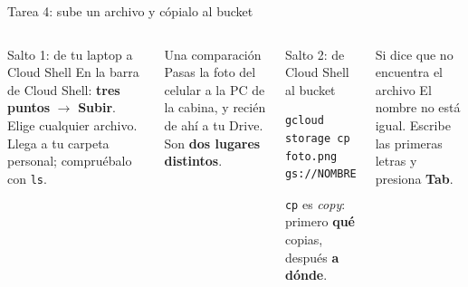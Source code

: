 \documentclass[aspectratio=169,10pt,c]{beamer}
\begin{document}
\begin{frame}[fragile]{Tarea 4: sube un archivo y cópialo al bucket}
\begin{center}
\end{center}
\begin{columns}[T,onlytextwidth]
\begin{block}{Salto 1: de tu laptop a Cloud Shell}
\small En la barra de Cloud Shell: \textbf{tres puntos} $\rightarrow$ \textbf{Subir}. Elige cualquier archivo. Llega a tu carpeta personal; compruébalo con \texttt{ls}.
\end{block}
\begin{exampleblock}{Una comparación}
\small Pasas la foto del celular a la PC de la cabina, y recién de ahí a tu Drive. Son \textbf{dos lugares distintos}.
\end{exampleblock}
\begin{block}{Salto 2: de Cloud Shell al bucket}
\begin{lstlisting}[basicstyle=\ttfamily\footnotesize]
gcloud storage cp foto.png gs://NOMBRE
\end{lstlisting}
\small \texttt{cp} es \emph{copy}: primero \textbf{qué} copias, después \textbf{a dónde}.
\end{block}
\begin{alertblock}{Si dice que no encuentra el archivo}
\small El nombre no está igual. Escribe las primeras letras y presiona \textbf{Tab}.
\end{alertblock}
\end{columns}
\end{frame}
\end{document}

